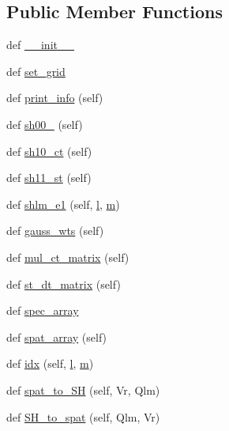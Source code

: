 \subsection*{Public Member Functions}
\begin{DoxyCompactItemize}
\item 
def \hyperlink{classshtns_1_1sht_a791d3a00bb0fb89e5bb609b1541fc62b}{\+\_\+\+\_\+init\+\_\+\+\_\+}
\item 
def \hyperlink{classshtns_1_1sht_a06f3a2d1124f98273b69496c3080945c}{set\+\_\+grid}
\item 
def \hyperlink{classshtns_1_1sht_ad0aca1b7631a089f98e10109ea94733f}{print\+\_\+info} (self)
\item 
def \hyperlink{classshtns_1_1sht_ad1b915eceae4ad8d4da2783a7d4ab2a0}{sh00\+\_} (self)
\item 
def \hyperlink{classshtns_1_1sht_a74b11055e0ed1fa24862914395c63a1e}{sh10\+\_\+ct} (self)
\item 
def \hyperlink{classshtns_1_1sht_a1879846e5a06eb0bf5be0b23120f7163}{sh11\+\_\+st} (self)
\item 
def \hyperlink{classshtns_1_1sht_a678cd1e60e4cc9959f741ff3c24a463c}{shlm\+\_\+e1} (self, \hyperlink{classshtns_1_1sht_afbfbd4354cf2721b21cc5cac5b7f0cb1}{l}, \hyperlink{classshtns_1_1sht_a629d4d76e7d9331ff17849dd46d32843}{m})
\item 
def \hyperlink{classshtns_1_1sht_a256beb903cd928f1bb11ea7000dff1da}{gauss\+\_\+wts} (self)
\item 
def \hyperlink{classshtns_1_1sht_a31494a233c8f732503063a7a57341465}{mul\+\_\+ct\+\_\+matrix} (self)
\item 
def \hyperlink{classshtns_1_1sht_ac0f5ee3d4d43609b1ae56ed4ad9d39a5}{st\+\_\+dt\+\_\+matrix} (self)
\item 
def \hyperlink{classshtns_1_1sht_a6986c2afa9eed9cacae1a96a00eb7024}{spec\+\_\+array}
\item 
def \hyperlink{classshtns_1_1sht_ab744a109fc2c5b8f47d1d358adf3f5e2}{spat\+\_\+array} (self)
\item 
def \hyperlink{classshtns_1_1sht_ac2c888b97bc13f2dffe988bc998089e8}{idx} (self, \hyperlink{classshtns_1_1sht_afbfbd4354cf2721b21cc5cac5b7f0cb1}{l}, \hyperlink{classshtns_1_1sht_a629d4d76e7d9331ff17849dd46d32843}{m})
\item 
def \hyperlink{classshtns_1_1sht_a3ea29550f33ffabd1777dacd7e129556}{spat\+\_\+to\+\_\+\+S\+H} (self, Vr, Qlm)
\item 
def \hyperlink{classshtns_1_1sht_ac033c4b6f73d8fb219620071540c0b3f}{S\+H\+\_\+to\+\_\+spat} (self, Qlm, Vr)

\end{DoxyCompactItemize}
